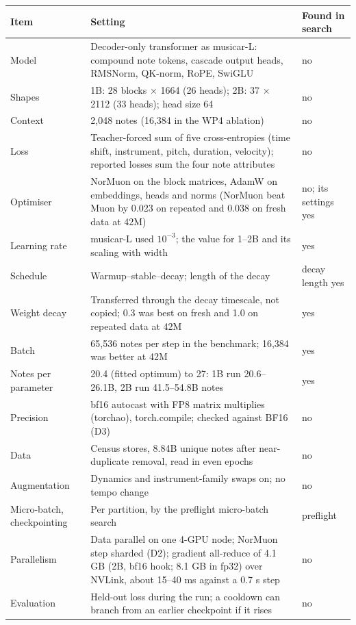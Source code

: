 \documentclass[11pt,a4paper]{article}
\begin{document}
\begin{tabularx}{\textwidth}{|L{3.4cm}|X|L{2.6cm}|}
\hline
\textbf{Item} & \textbf{Setting} & \textbf{Found in search}\\ \hline
Model & Decoder-only transformer as musicar-L: compound note tokens, cascade output heads, RMSNorm, QK-norm, RoPE,
SwiGLU & no\\ \hline
Shapes & 1B: 28 blocks $\times$ 1664 (26 heads); 2B: 37 $\times$ 2112 (33 heads); head size 64 & no\\ \hline
Context & 2,048 notes (16,384 in the WP4 ablation) & no\\ \hline
Loss & Teacher-forced sum of five cross-entropies (time shift, instrument, pitch, duration, velocity); reported losses sum the four note attributes & no\\ \hline
Optimiser & NorMuon on the block matrices, AdamW on embeddings, heads and norms (NorMuon beat Muon by 0.023 on
repeated and 0.038 on fresh data at 42M) & no; its settings yes\\ \hline
Learning rate & musicar-L used $10^{-3}$; the value for 1--2B and its scaling with width & yes\\ \hline
Schedule & Warmup--stable--decay; length of the decay & decay length yes\\ \hline
Weight decay & Transferred through the decay timescale, not copied; 0.3 was best on fresh and 1.0 on repeated data at
42M & yes\\ \hline
Batch & 65,536 notes per step in the benchmark; 16,384 was better at 42M & yes\\ \hline
Notes per parameter & 20.4 (fitted optimum) to 27: 1B run 20.6--26.1B, 2B run 41.5--54.8B notes & yes\\ \hline
Precision & bf16 autocast with FP8 matrix multiplies (torchao), torch.compile; checked against BF16 (D3) & no\\ \hline
Data & Census stores, 8.84B unique notes after near-duplicate removal, read in even epochs & no\\ \hline
Augmentation & Dynamics and instrument-family swaps on; no tempo change & no\\ \hline
Micro-batch, checkpointing & Per partition, by the preflight micro-batch search & preflight\\ \hline
Parallelism & Data parallel on one 4-GPU node; NorMuon step sharded (D2); gradient all-reduce of 4.1 GB (2B, bf16 hook;
8.1 GB in fp32) over NVLink, about 15--40 ms against a 0.7 s step & no\\ \hline
Evaluation & Held-out loss during the run; a cooldown can branch from an earlier checkpoint if it rises & no\\ \hline
\end{tabularx}
\vspace{4pt}
\end{document}
